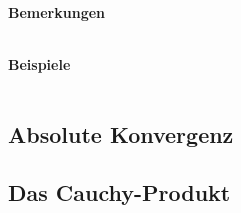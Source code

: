 \noindent
\textbf{Bemerkungen}
\begin{table}[H]
\begin{tabularx}{\textwidth}{X m{16cm}}
    \toprule

    & \\

    \bottomrule
\end{tabularx}
\end{table}

\noindent
\textbf{Beispiele}
\begin{table}[h]
\begin{tabularx}{\textwidth}{X m{16cm}}
    \toprule

    & \\

    \bottomrule
\end{tabularx}
\end{table}
\subsection{Absolute Konvergenz}
\subsection{Das Cauchy-Produkt}


